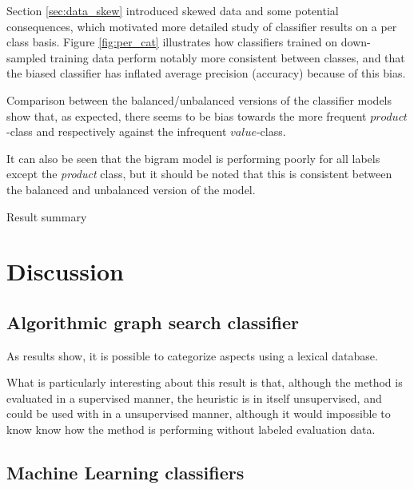 \documentclass[a4paper,11pt]{kth-mag}
\begin{document}
Section \ref{sec:data_skew} introduced skewed data and some potential consequences, which motivated more detailed study of classifier results on a per class basis. Figure \ref{fig:per_cat} illustrates how classifiers trained on
down-sampled training data perform notably more consistent between classes, and that the biased classifier has inflated average precision (accuracy) because of this bias.

Comparison between the balanced/unbalanced versions of the classifier models show that, as expected, there seems to be bias towards the more frequent $product$-class and respectively against the infrequent $value$-class.

It can also be seen that the bigram model is performing poorly for all labels except the \emph{product} class, but it should be noted that this is consistent between the balanced and unbalanced version of the model.


\begin{table}[h]
  \centering

  \vspace{0.4cm}\caption{Result summary}
  \label{general_asp}
\end{table}

\section{Discussion}
\subsection{Algorithmic graph search classifier}
As results show, it is possible to categorize aspects using a lexical database.

What is particularly interesting about this result is that, although the method is evaluated in a supervised
manner, the heuristic is in itself unsupervised, and could be used with in a unsupervised manner, although it would impossible to know know how the method is performing without labeled evaluation data.

\subsection{Machine Learning classifiers}
\end{document}
